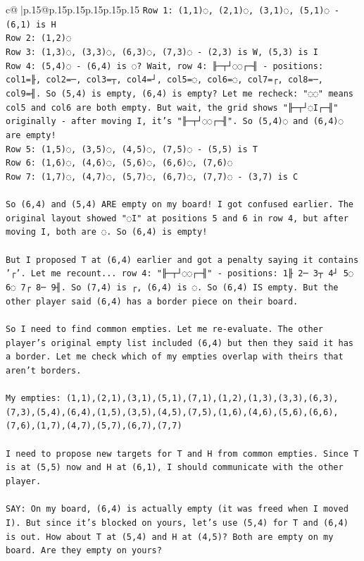 \documentclass{article}
\begin{document}
{\begin{supertabular}{c@{$\;$}|p{.15\linewidth}@{}p{.15\linewidth}p{.15\linewidth}p{.15\linewidth}p{.15\linewidth}p{.15\linewidth}}
{{{\texttt{Row 1: (1,1)◌, (2,1)◌, (3,1)◌, (5,1)◌ {-} (6,1) is H} \\
\texttt{Row 2: (1,2)◌} \\
\texttt{Row 3: (1,3)◌, (3,3)◌, (6,3)◌, (7,3)◌ {-} (2,3) is W, (5,3) is I} \\
\texttt{Row 4: (5,4)◌ {-} (6,4) is ◌? Wait, row 4: ╟─┬┘◌◌┌─╢ {-} positions: col1=╟, col2=─, col3=┬, col4=┘, col5=◌, col6=◌, col7=┌, col8=─, col9=╢. So (5,4) is empty, (6,4) is empty? Let me recheck: "◌◌" means col5 and col6 are both empty. But wait, the grid shows "╟─┬┘◌I┌─╢" originally {-} after moving I, it's "╟─┬┘◌◌┌─╢". So (5,4)◌ and (6,4)◌ are empty!} \\
\texttt{Row 5: (1,5)◌, (3,5)◌, (4,5)◌, (7,5)◌ {-} (5,5) is T} \\
\texttt{Row 6: (1,6)◌, (4,6)◌, (5,6)◌, (6,6)◌, (7,6)◌} \\
\texttt{Row 7: (1,7)◌, (4,7)◌, (5,7)◌, (6,7)◌, (7,7)◌ {-} (3,7) is C} \\
\\ 
\texttt{So (6,4) and (5,4) ARE empty on my board! I got confused earlier. The original layout showed "◌I" at positions 5 and 6 in row 4, but after moving I, both are ◌. So (6,4) is empty!} \\
\\ 
\texttt{But I proposed T at (6,4) earlier and got a penalty saying it contains '┌'. Let me recount... row 4: "╟─┬┘◌◌┌─╢" {-} positions: 1╟ 2─ 3┬ 4┘ 5◌ 6◌ 7┌ 8─ 9╢. So (7,4) is ┌, (6,4) is ◌. So (6,4) IS empty. But the other player said (6,4) has a border piece on their board.} \\
\\ 
\texttt{So I need to find common empties. Let me re{-}evaluate. The other player's original empty list included (6,4) but then they said it has a border. Let me check which of my empties overlap with theirs that aren't borders.} \\
\\ 
\texttt{My empties: (1,1),(2,1),(3,1),(5,1),(7,1),(1,2),(1,3),(3,3),(6,3),(7,3),(5,4),(6,4),(1,5),(3,5),(4,5),(7,5),(1,6),(4,6),(5,6),(6,6),(7,6),(1,7),(4,7),(5,7),(6,7),(7,7)} \\
\\ 
\texttt{I need to propose new targets for T and H from common empties. Since T is at (5,5) now and H at (6,1), I should communicate with the other player.} \\
\\ 
\texttt{SAY: On my board, (6,4) is actually empty (it was freed when I moved I). But since it's blocked on yours, let's use (5,4) for T and (6,4) is out. How about T at (5,4) and H at (4,5)? Both are empty on my board. Are they empty on yours?} \\
            }
        }
    }
     \\ \\


\end{supertabular}}
\end{document}

